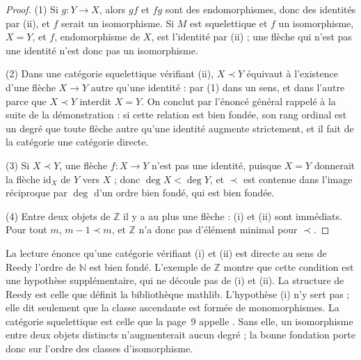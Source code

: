 \begin{proof}
(1) Si $g : Y \to X$, alors $gf$ et $fg$ sont des endomorphismes, donc des identités par (ii), et $f$ serait un isomorphisme. Si $M$ est squelettique et $f$ un isomorphisme, $X = Y$, et $f$, endomorphisme de $X$, est l'identité par (ii) ; une flèche qui n'est pas une identité n'est donc pas un isomorphisme.

(2) Dans une catégorie squelettique vérifiant (ii), $X \prec Y$ équivaut à l'existence d'une flèche $X \to Y$ autre qu'une identité : par (1) dans un sens, et dans l'autre parce que $X \prec Y$ interdit $X = Y$. On conclut par l'énoncé général rappelé à la suite de la démonstration : si cette relation est bien fondée, son rang ordinal est un degré que toute flèche autre qu'une identité augmente strictement, et il fait de la catégorie une catégorie directe.

(3) Si $X \prec Y$, une flèche $f : X \to Y$ n'est pas une identité, puisque $X = Y$ donnerait la flèche $\mathrm{id}_X$ de $Y$ vers $X$ ; donc $\deg X < \deg Y$, et $\prec$ est contenue dans l'image réciproque par $\deg$ d'un ordre bien fondé, qui est bien fondée.

(4) Entre deux objets de $\mathbb Z$ il y a au plus une flèche : (i) et (ii) sont immédiats. Pour tout $m$, $m - 1 \prec m$, et $\mathbb Z$ n'a donc pas d'élément minimal pour $\prec$.
\end{proof}

\begin{remarque}
La lecture énonce qu'une catégorie vérifiant (i) et (ii) est directe au sens de Reedy  l'ordre de $\mathbb N$ est bien fondé. L'exemple de $\mathbb Z$ montre que cette condition est une hypothèse supplémentaire, qui ne découle pas de (i) et (ii). La structure de Reedy est celle que définit la bibliothèque mathlib. L'hypothèse (i) n'y sert pas ; elle dit seulement que la classe ascendante est formée de monomorphismes. La catégorie squelettique est celle que la page~9 appelle . Sans elle, un isomorphisme entre deux objets distincts n'augmenterait aucun degré ; la bonne fondation porte donc sur l'ordre des classes d'isomorphisme.
\end{remarque}

